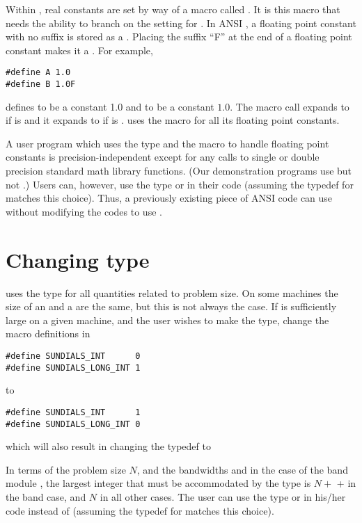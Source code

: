 Within {\sundials}, real constants are set by way of a macro called
.  It is this macro that needs the ability to branch on the
setting for .  In ANSI {\C}, a floating point constant with no
suffix is stored as a .  Placing the suffix ``F'' at the
end of a floating point constant makes it a . For example,
\begin{verbatim}
#define A 1.0
#define B 1.0F
\end{verbatim}
defines  to be a  constant 1.0 and  to be a
 constant $1.0$. The macro call 
expands to  if  is  and it expands to
 if  is . {\sundials} uses the  macro for
all its floating point constants. 

A user program which uses the type  and the  macro
to handle floating point constants is precision-independent except for
any calls to single or double precision standard math library
functions.  (Our demonstration programs use  but not
.)  Users can, however, use the type  or
 in their code (assuming the typedef for  matches
this choice).  Thus, a previously existing piece of ANSI {\C} code can use
{\sundials} without modifying the codes to use .

\section{Changing type }

{\sundials} uses the type  for all quantities related to problem
size.  On some machines the size of an  and a 
are the same, but this is not always the case. 
If  is sufficiently large on a given machine, and the user wishes
to make  the  type, change the macro definitions in 
\begin{verbatim}
#define SUNDIALS_INT      0
#define SUNDIALS_LONG_INT 1
\end{verbatim}
to
\begin{verbatim}
#define SUNDIALS_INT      1
#define SUNDIALS_LONG_INT 0
\end{verbatim}
which will also result in changing the typedef  
to 

In terms of the problem size $N$, and the bandwidths  and  
in the case of the band module {\band}, the largest integer that must be 
accommodated by the  type is $N + $  +  in the 
band case, and $N$ in all other cases. The user can use the type  
or  in his/her code instead of  (assuming the 
typedef for  matches this choice).